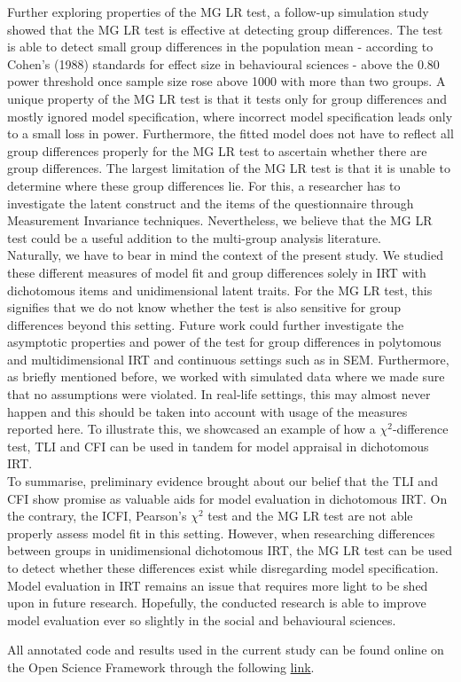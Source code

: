 \documentclass[Royal,sageapa,times,doublespace]{sagej}
\begin{document}
\indent Further exploring properties of the MG LR test, a follow-up simulation study showed that the MG LR test is effective at detecting group differences. The test is able to detect small group differences in the population mean - according to Cohen's (1988) standards for effect size in behavioural sciences - above the 0.80 power threshold once sample size rose above 1000 with more than two groups. A unique property of the MG LR test is that it tests only for group differences and mostly ignored model specification, where incorrect model specification leads only to a small loss in power. Furthermore, the fitted model does not have to reflect all group differences properly for the MG LR test to ascertain whether there are group differences. The largest limitation of the MG LR test is that it is unable to determine where these group differences lie. For this, a researcher has to investigate the latent construct and the items of the questionnaire through Measurement Invariance techniques. Nevertheless, we believe that the MG LR test could be a useful addition to the multi-group analysis literature. \\
\indent Naturally, we have to bear in mind the context of the present study. We studied these different measures of model fit and group differences solely in IRT with dichotomous items and unidimensional latent traits. For the MG LR test, this signifies that we do not know whether the test is also sensitive for group differences beyond this setting. Future work could further investigate the asymptotic properties and power of the test for group differences in polytomous and multidimensional IRT and continuous settings such as in SEM. Furthermore, as briefly mentioned before, we worked with simulated data where we made sure that no assumptions were violated. In real-life settings, this may almost never happen and this should be taken into account with usage of the measures reported here. To illustrate this, we showcased an example of how a $\chi^2$-difference test, TLI and CFI can be used in tandem for model appraisal in dichotomous IRT. \\
\indent To summarise, preliminary evidence brought about our belief that the TLI and CFI show promise as valuable aids for model evaluation in dichotomous IRT. On the contrary, the ICFI, Pearson's $\chi^2$ test and the MG LR test are not able properly assess model fit in this setting. However, when researching differences between groups in unidimensional dichotomous IRT, the MG LR test can be used to detect whether these differences exist while disregarding model specification. Model evaluation in IRT remains an issue that requires more light to be shed upon in future research. Hopefully, the conducted research is able to improve model evaluation ever so slightly in the social and behavioural sciences. 

\begin{sm}
All annotated code and results used in the current study can be found online on the Open Science Framework through the following \href{https://osf.io/dtbcr/?view_only=e32e5f8a43124434b5a53a44ff26ad23}{link}.
\end{sm}

\newpage

\nocite{*}


\end{document}
